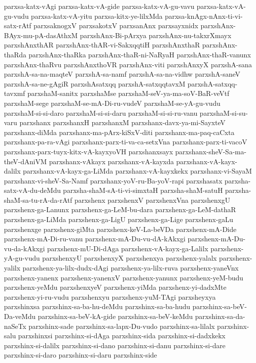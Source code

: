 {parxsa-katx-vAgi
parxsa-katx-vA-gide
parxsa-katx-vA-gu-vavu
parxsa-katx-vA-gu-vudu
parxsa-katx-vA-yitu
parxsa-kitx-ye-lilxMda
parxsa-knAgx-nAnx-ti-vi-satx-rAtf
parxsaknogxV
parxsakotxV
parxsanAnx
parxsayxnidx
parxshAnx-BAyx-mu-pA-dasAthxM
parxshAnx-Bi-pArxya
parxshAnx-nu-takxrXmayx
parxshAnxthAR
parxshAnx-thAR-vi-SakxqqtiH
parxshAnxthaR
parxshAnx-thaRda
parxshAnx-thaRka
parxshAnx-thaR-ni-NaRyaH
parxshAnx-thaR-vanunx
parxshAnx-thaRvu
parxshAnxthoVR
parxshAnx-viti
parxshAnxyX
parxshA-sana
parxshA-sa-na-maqteV
parxshA-sa-namf
parxshA-sa-na-vidhw
parxshA-saneV
parxshA-sa-ne-gAgiR
parxshAsatxqq
parxshA-satxqqtavxM
parxshA-satxqq-tavxmf
parxshaM-sanitx
parxshaMse
parxshaM-seV-ya-ma-soV-BaR-veVtf
parxshaM-sege
parxshaM-se-mA-Di-ru-vudeV
parxshaM-se-yA-gu-vudu
parxshaM-si-si-daro
parxshaM-si-si-daru
parxshaM-si-si-ru-vanu
parxshaM-si-su-varu
parxshanx
parxshanxH
parxshanxM
parxshanx-davx-ya-mi-SayxteV
parxshanx-diMda
parxshanx-ma-pArx-kiSxV-diti
parxshanx-ma-paq-caCxta
parxshanx-pa-ra-vAgi
parxshanx-parx-ti-va-ca-setxVna
parxshanx-parx-ti-vacoV
parxshanx-parx-tuyx-kitx-vA-kayxyoVH
parxshanxsayx
parxshanx-sheV-Sa-ma-theV-dAniVM
parxshanx-vAkayx
parxshanx-vA-kayxda
parxshanx-vA-kayx-dalilx
parxshanx-vA-kayx-ga-LiMda
parxshanx-vA-kayxkekx
parxshanx-vi-SayaM
parxshanx-vi-sheV-Sa-Namf
parxshanx-yoV-ru-Ba-yoV-rapi
parxshasatx
parxsha-satx-vA-du-deMdu
parxsha-shaM-sA-ti-vi-simxtaH
parxsha-shaM-satuH
parxsha-shaM-sa-tu-rA-da-rAtf
parxshenx
parxshenxV
parxshenxVna
parxshenxgU
parxshenx-ga-Lanunx
parxshenx-ga-LeM-bu-dara
parxshenx-ga-LeM-dathaR
parxshenx-ga-LiMda
parxshenx-ga-LigU
parxshenx-ga-Lige
parxshenx-gaLu
parxshenxge
parxshenx-giMta
parxshenx-keV-La-beVDa
parxshenx-mA-Dide
parxshenx-mA-Di-ru-vanu
parxshenx-mA-Du-vu-dA-kAkxgi
parxshenx-mA-Du-vu-da-kAkxgi
parxshenx-mU-Di-dAga
parxshenx-vA-kayx-ga-Lalilx
parxshenx-yA-gu-vudu
parxshenxyU
parxshenxyX
parxshenxya
parxshenx-yalalx
parxshenx-yalilx
parxshenx-ya-lilx-dudx-dAgi
parxshenx-ya-lilx-ruva
parxshenx-yaneVnx
parxshenx-yanenx
parxshenx-yanenxV
parxshenx-yanunx
parxshenx-yeM-budu
parxshenx-yeMdu
parxshenxyeV
parxshenx-yiMda
parxshenx-yi-dadxMte
parxshenx-yi-ru-vudu
parxshenxyu
parxshenx-yuM-TAgi
parxsheyxya
parxshinxsa
parxshinx-sa-ba-hu-deMdu
parxshinx-sa-ba-hudu
parxshinx-sa-beV-Da-veMdu
parxshinx-sa-beV-kA-gide
parxshinx-sa-beV-keMdu
parxshinx-sa-da-naSeTx
parxshinx-sade
parxshinx-sa-lapx-Du-vudo
parxshinx-sa-lilalx
parxshinx-salu
parxshinxsi
parxshinx-si-dAga
parxshinx-sida
parxshinx-si-dadxkekx
parxshinx-si-dalilx
parxshinx-si-dano
parxshinx-si-danu
parxshinx-si-dare
parxshinx-si-daro
parxshinx-si-daru
parxshinx-side
}
